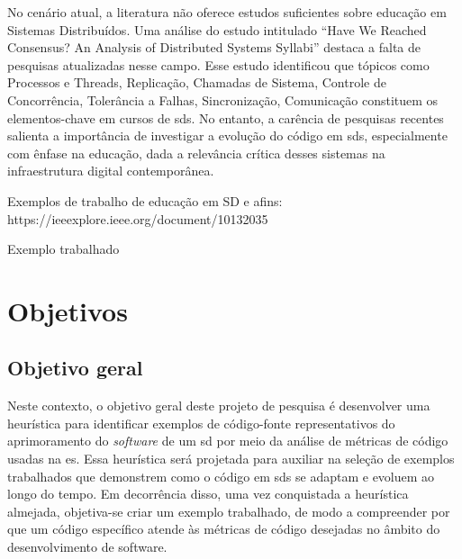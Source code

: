 No cenário atual, a literatura não oferece estudos suficientes sobre educação em Sistemas Distribuídos. Uma análise do estudo intitulado ``Have We Reached Consensus? An Analysis of Distributed Systems Syllabi'' \cite{HaveWeReachedConsensus} destaca a falta de pesquisas atualizadas nesse campo. Esse estudo identificou que tópicos como Processos e Threads, Replicação, Chamadas de Sistema, Controle de Concorrência, Tolerância a Falhas, Sincronização, Comunicação constituem os elementos-chave em cursos de \gls{sds}. No entanto, a carência de pesquisas recentes salienta a importância de investigar a evolução do código em \gls{sds}, especialmente com ênfase na educação, dada a relevância crítica desses sistemas na infraestrutura digital contemporânea.

Exemplos de trabalho de educação em SD e afins: https://ieeexplore.ieee.org/document/10132035

Exemplo trabalhado

\section{Objetivos}\label{sec:objetivos}
\subsection{Objetivo geral}\label{subsec:objetivoGeral}
 Neste contexto, o objetivo geral deste projeto de pesquisa é desenvolver uma heurística para identificar exemplos de código-fonte representativos do aprimoramento do \textit{software} de um \gls{sd} por meio da análise de métricas de código usadas na \gls{es}. Essa heurística será projetada para auxiliar na seleção de exemplos trabalhados que demonstrem como o código em \gls{sds} se adaptam e evoluem ao longo do tempo. Em decorrência disso, uma vez conquistada a heurística almejada, objetiva-se criar um exemplo trabalhado, de modo a compreender por que um código específico atende às métricas de código desejadas no âmbito do desenvolvimento de software.

